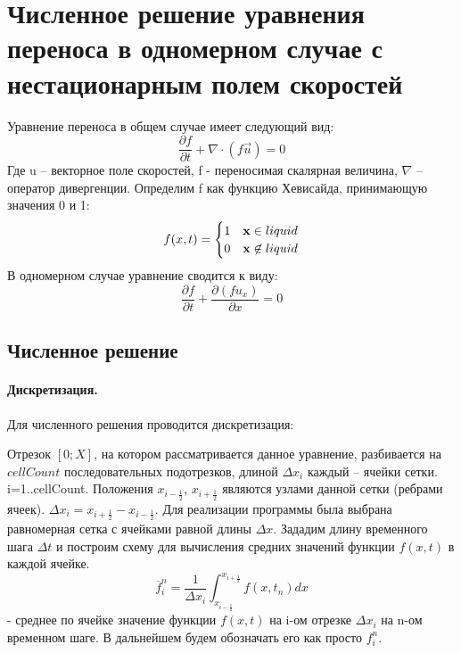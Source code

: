\documentclass[12pt,a4paper]{article}
\begin{document}
\section{Численное решение уравнения переноса в одномерном случае с нестационарным полем скоростей}
Уравнение переноса в общем случае имеет следующий вид:
\begin{equation}
\label{eqn:TE}
\frac{\partial f}{\partial t}+\nabla\cdot(f\overrightarrow{u})=0
\end{equation}
Где u – векторное поле скоростей, f - переносимая скалярная величина, $ \nabla $ – оператор дивергенции. Определим f как функцию Хевисайда, принимающую значения 0 и 1:
\begin{equation}
f(x,t)=\begin{cases}1 & {\bf x}\in liquid \\0 & {\bf x}\not\in liquid\end{cases}
\end{equation}
В одномерном случае уравнение сводится к виду:
\begin{equation}
\label{eqn:TE1D}
\frac{\partial f}{\partial t} + \frac{\partial (f u_{x})}{\partial x}=0
\end{equation}

\subsection{Численное решение}
\label{sec:TESolutionUnonstat}
\paragraph{Дискретизация.}
Для численного решения проводится дискретизация:

Отрезок $[0;X]$, на котором рассматривается данное уравнение, разбивается на $cellCount$ последовательных подотрезков, длиной $\Delta x_i$ каждый – ячейки сетки. i=1..cellCount. Положения $x_{i-\frac{1}{2}}$, $x_{i+\frac{1}{2}}$ являются узлами данной сетки (ребрами ячеек). $\Delta x_i=x_{i+\frac{1}{2}}-x_{i-\frac{1}{2}}$. Для реализации программы была выбрана равномерная сетка с ячейками равной длины $\Delta x$. Зададим длину временного шага $\Delta t$ и построим схему для вычисления средних значений функции $f(x,t)$ в каждой ячейке.
\begin{equation}
\overline{f}_i^n=\frac{1}{\Delta x_i}\int_{x_{i-\frac{1}{2}}}^{x_{i+\frac{1}{2}}}f(x,t_n)dx 
\end{equation}
- среднее по ячейке значение функции $f(x,t)$ на i-ом отрезке $\Delta x_i$ на n-ом временном шаге. В дальнейшем будем обозначать его как просто $f_i^n$.
\end{document}
